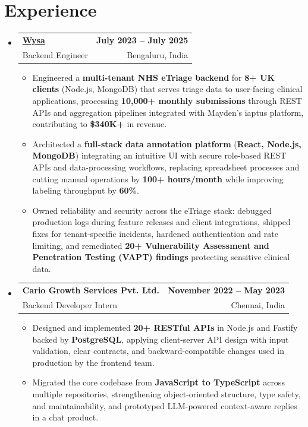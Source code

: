 \documentclass[letterpaper,10pt]{article}
\makeatletter
\newcommand{\resumeItem}[1]{
  \item\small{#1\vspace{-1pt}}
}
\newcommand{\resumeSubheading}[4]{
  \vspace{1pt}\item
    \begin{tabular*}{0.985\textwidth}[t]{l@{\extracolsep{\fill}}r}
      \textbf{#1} & \textbf{\small #2} \\
      {\small\color{ResumeSlate} #3} & {\small\color{ResumeSlate} #4} \\
    \end{tabular*}\vspace{-6pt}
}
\newcommand{\resumeSubHeadingListStart}{\begin{itemize}[leftmargin=0.0in, label={}, itemsep=2pt, topsep=2pt]}
\newcommand{\resumeSubHeadingListEnd}{\end{itemize}}
\newcommand{\resumeItemListStart}{\begin{itemize}[leftmargin=0.18in, itemsep=2pt, topsep=1pt]}
\newcommand{\resumeItemListEnd}{\end{itemize}\vspace{-4pt}}
\makeatother
\begin{document}
\section{Experience}
\resumeSubHeadingListStart
  \resumeSubheading
    {\href{https://www.wysa.io}{Wysa}}{July 2023 -- July 2025}
    {Backend Engineer}{Bengaluru, India}
    \resumeItemListStart
      \resumeItem{Engineered a \textbf{multi-tenant NHS eTriage backend} for \textbf{8+ UK clients} (Node.js, MongoDB) that serves triage data to user-facing clinical applications, processing \textbf{10{,}000+ monthly submissions} through REST APIs and aggregation pipelines integrated with Mayden's iaptus platform, contributing to \textbf{\$340K+} in revenue.}
      \resumeItem{Architected a \textbf{full-stack data annotation platform} (\textbf{React, Node.js, MongoDB}) integrating an intuitive UI with secure role-based REST APIs and data-processing workflows, replacing spreadsheet processes and cutting manual operations by \textbf{100+ hours/month} while improving labeling throughput by \textbf{60\%}.}
      \resumeItem{Owned reliability and security across the eTriage stack: debugged production logs during feature releases and client integrations, shipped fixes for tenant-specific incidents, hardened authentication and rate limiting, and remediated \textbf{20+ Vulnerability Assessment and Penetration Testing (VAPT) findings} protecting sensitive clinical data.}
    \resumeItemListEnd
  \resumeSubheading
    {Cario Growth Services Pvt. Ltd.}{November 2022 -- May 2023}
    {Backend Developer Intern}{Chennai, India}
    \resumeItemListStart
      \resumeItem{Designed and implemented \textbf{20+ RESTful APIs} in Node.js and Fastify backed by \textbf{PostgreSQL}, applying client-server API design with input validation, clear contracts, and backward-compatible changes used in production by the frontend team.}
      \resumeItem{Migrated the core codebase from \textbf{JavaScript to TypeScript} across multiple repositories, strengthening object-oriented structure, type safety, and maintainability, and prototyped LLM-powered context-aware replies in a chat product.}
    \resumeItemListEnd
\resumeSubHeadingListEnd
\vspace{-4pt}
\end{document}
